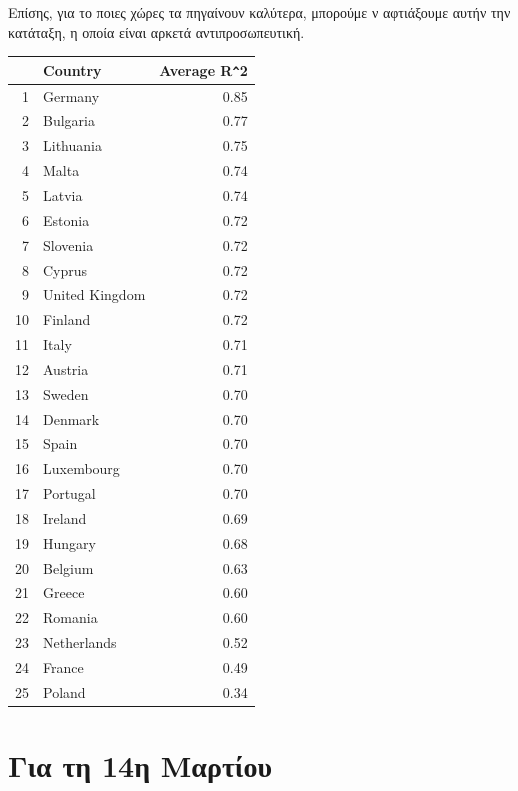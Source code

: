 \documentclass[a4paper,twoside,10pt]{article}
\begin{document}
	Επίσης, για το ποιες χώρες τα πηγαίνουν καλύτερα, μπορούμε ν αφτιάξουμε αυτήν την κατάταξη, η οποία είναι αρκετά αντιπροσωπευτική.
	\begin{table}[H]
		\centering
		\begin{tabular}{rlr}
			\hline
			& Country & Average R\verb|^|2 \\
			\hline
			1 & Germany & 0.85 \\
			2 & Bulgaria & 0.77 \\
			3 & Lithuania & 0.75 \\
			4 & Malta & 0.74 \\
			5 & Latvia & 0.74 \\ 
			6 & Estonia & 0.72 \\
			7 & Slovenia & 0.72 \\
			8 & Cyprus & 0.72 \\
			9 & United Kingdom & 0.72 \\
			10 & Finland & 0.72 \\
			11 & Italy & 0.71 \\
			12 & Austria & 0.71 \\
			13 & Sweden & 0.70 \\ 
			14 & Denmark & 0.70 \\
			15 & Spain & 0.70 \\
			16 & Luxembourg & 0.70 \\
			17 & Portugal & 0.70 \\
			18 & Ireland & 0.69 \\
			19 & Hungary & 0.68 \\
			20 & Belgium & 0.63 \\
			21 & Greece & 0.60 \\
			22 & Romania & 0.60 \\
			23 & Netherlands & 0.52 \\
			24 & France & 0.49 \\ 
			25 & Poland & 0.34 \\
			\hline
		\end{tabular}
	\end{table}

	\newpage
	\section{Για τη 14η Μαρτίου}
	
\end{document}
